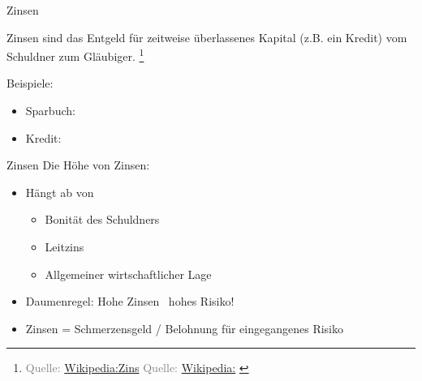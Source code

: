 \documentclass{beamer}
\let\oldfootnote\footnote
\renewcommand{\footnote}[1]
{%
	\oldfootnote
	{
		\tiny
		\textcolor{gray}{#1}
	}%
}
\newcommand{\citewiki}[2][]
{%
	\footnote
	{
		\ifthenelse{\isempty{#1}}
		{
			Quelle: \href{https://de.wikipedia.org/wiki/#2}{Wikipedia:#2}
		}
		{
			Quelle: \href{https://de.wikipedia.org/wiki/#2}{Wikipedia:#1}
		}
	}
}
\begin{document}
			\begin{frame}{Zinsen}
				\begin{definition}
					Zinsen sind das Entgeld für zeitweise überlassenes Kapital (z.B. ein Kredit) vom Schuldner zum Gläubiger.\citewiki{Zins}
				\end{definition}
				Beispiele:
				\begin{multicols}{2}
					\begin{itemize}
						\item Sparbuch:\\
						\columnbreak
						\item Kredit:\\
					\end{itemize}
				\end{multicols}
			\end{frame}
		
			\begin{frame}{Zinsen}
				Die Höhe von Zinsen:
				\begin{itemize}
					\item Hängt ab von
					\begin{itemize}
						\item Bonität des Schuldners
						\item Leitzins
						\item Allgemeiner wirtschaftlicher Lage
					\end{itemize}
					\item Daumenregel: Hohe Zinsen \textrightarrow\ hohes Risiko!
					\item Zinsen = Schmerzensgeld / Belohnung für eingegangenes Risiko
				\end{itemize}
			\end{frame}
		
\end{document}
